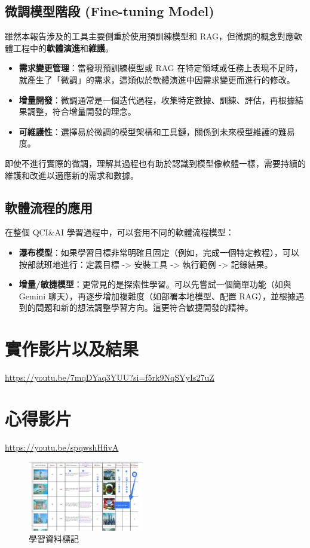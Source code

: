 \documentclass[twocolumn,11pt,a4paper]{article}
\begin{document}
\subsection{微調模型階段 (Fine-tuning Model)}
雖然本報告涉及的工具主要側重於使用預訓練模型和 RAG，但微調的概念對應軟體工程中的\textbf{軟體演進}和\textbf{維護}。
\begin{itemize}[noitemsep, topsep=0pt]
    \item \textbf{需求變更管理}：當發現預訓練模型或 RAG 在特定領域或任務上表現不足時，就產生了「微調」的需求，這類似於軟體演進中因需求變更而進行的修改。
    \item \textbf{增量開發}：微調通常是一個迭代過程，收集特定數據、訓練、評估，再根據結果調整，符合增量開發的理念。
    \item \textbf{可維護性}：選擇易於微調的模型架構和工具鏈，關係到未來模型維護的難易度。
\end{itemize}
即使不進行實際的微調，理解其過程也有助於認識到模型像軟體一樣，需要持續的維護和改進以適應新的需求和數據。

\subsection{軟體流程的應用}
在整個 QCI\&AI 學習過程中，可以套用不同的軟體流程模型：
\begin{itemize}[noitemsep, topsep=0pt]
    \item \textbf{瀑布模型}：如果學習目標非常明確且固定（例如，完成一個特定教程），可以按部就班地進行：定義目標 -> 安裝工具 -> 執行範例 -> 記錄結果。
    \item \textbf{增量/敏捷模型}：更常見的是探索性學習。可以先嘗試一個簡單功能（如與 Gemini 聊天），再逐步增加複雜度（如部署本地模型、配置 RAG），並根據遇到的問題和新的想法調整學習方向。這更符合敏捷開發的精神。
\end{itemize}

\section{實作影片以及結果}
\href{https://youtu.be/7mqDYaq3YUU?si=f5rk9NqSYyIs27uZ}{https://youtu.be/7mqDYaq3YUU?si=f5rk9NqSYyIs27uZ}

\section{心得影片}
\href{https://youtu.be/spqwshHfivA}{https://youtu.be/spqwshHfivA}

\begin{figure}[htbp] %
    \centering
    \includegraphics[width=0.45\textwidth]{res/image/labeling_train_data.png} %
    \caption{學習資料標記} %
    \label{fig:labeling_dataset} %
\end{figure}
\end{document}
